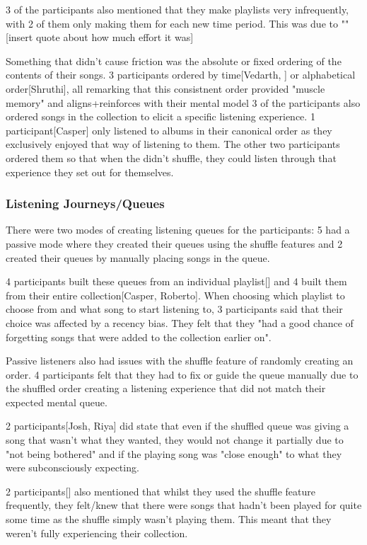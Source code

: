3 of the participants also mentioned that they make playlists very infrequently, with 2 of them only making them for each new time period. This was due to ""[insert quote about how much effort it was]

Something that didn't cause friction was the absolute or fixed ordering of the contents of their songs. 3 participants ordered by time[Vedarth, ] or alphabetical order[Shruthi], all remarking that this consistnent order provided "muscle memory" and aligns+reinforces with their mental model
3 of the participants also ordered songs in the collection to elicit a specific listening experience. 1 participant[Casper] only listened to albums in their canonical order as they exclusively enjoyed that way of listening to them. The other two participants ordered them so that when the didn't shuffle, they could listen through that experience they set out for themselves.

\subsubsection{Listening Journeys/Queues}
There were two modes of creating listening queues for the participants: 5 had a passive mode where they created their queues using the shuffle features and 2 created their queues by manually placing songs in the queue.

4 participants built these queues from an individual playlist[] and 4 built them from their entire collection[Casper, Roberto]. When choosing which playlist to choose from and what song to start listening to, 3 participants said that their choice was affected by a recency bias. They felt that they "had a good chance of forgetting songs that were added to the collection earlier on".

Passive listeners also had issues with the shuffle feature of randomly creating an order. 4 participants felt that they had to fix or guide the queue manually due to the shuffled order creating a listening experience that did not match their expected mental queue.

2 participants[Josh, Riya] did state that even if the shuffled queue was giving a song that wasn't what they wanted, they would not change it partially due to "not being bothered" and if the playing song was "close enough" to what they were subconsciously expecting.

2 participants[] also mentioned that whilst they used the shuffle feature frequently, they felt/knew that there were songs that hadn't been played for quite some time as the shuffle simply wasn't playing them. This meant that they weren't fully experiencing their collection.

